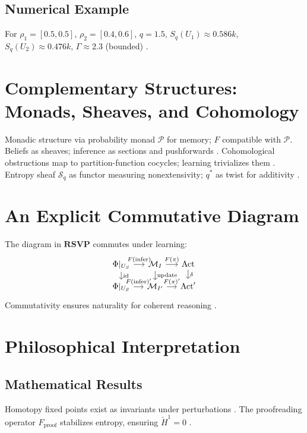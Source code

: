 \documentclass{article}
\theoremstyle{plain}
\theoremstyle{definition}
\begin{document}
\subsection{Numerical Example}
For $\rho_1 = [0.5, 0.5]$, $\rho_2 = [0.4, 0.6]$, $q=1.5$, $S_q(U_1) \approx 0.586k$, $S_q(U_2) \approx 0.476k$, $\Gamma \approx 2.3$ (bounded) \cite{Soares2024}.

\section{Complementary Structures: Monads, Sheaves, and Cohomology}

Monadic structure via probability monad $\mathcal{P}$ for memory; $F$ compatible with $\mathcal{P}$. Beliefs as sheaves; inference as sections and pushforwards \cite{MacLane1992,Goguen1992}. Cohomological obstructions map to partition-function cocycles; learning trivializes them \cite{Soares2024,Tsallis1988}. Entropy sheaf $\mathcal{S}_q$ as functor measuring nonextensivity; $q^*$ as twist for additivity \cite{Soares2023}.

\section{An Explicit Commutative Diagram}

The diagram in $\mathbf{RSVP}$ commutes under learning:
\[
\begin{tikzcd}[scale=0.6, column sep=small, row sep=small, every node/.style={font=\small}, ampersand replacement=\&]
\Phi|_{U_S} \arrow[r, "F(\text{infer})"] \arrow[d, "\text{id}"] \& \mathcal{M}_I \arrow[r, "F(\pi)"] \arrow[d, "\text{update}"] \& \text{Act} \arrow[d, "\delta"] \\
\Phi|_{U_S} \arrow[r, "F(\text{infer})'"] \& \mathcal{M}_{I'} \arrow[r, "F(\pi)'"] \& \text{Act}'
\end{tikzcd}
\]
Commutativity ensures naturality for coherent reasoning \cite{Spivak2014}.

\section{Philosophical Interpretation}

\subsection{Mathematical Results}
Homotopy fixed points exist as invariants under perturbations \cite{Awodey2010}. The proofreading operator $F_\text{proof}$ stabilizes entropy, ensuring $\check{H}^1 = 0$ \cite{Liang2025}.
\end{document}

